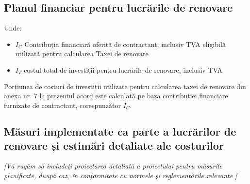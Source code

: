 \subsection{Planul financiar pentru lucrările de renovare}


\begin{center}
\end{center}

\vspace{1cm}

Unde:

\begin{itemize}[label={}]
	\item $I_C$ \quad \quad Contribuția financiară oferită de contractant, inclusiv TVA eligibilă utilizată pentru calcularea Taxei de renovare
	\item $I_T$ \quad \quad costul total de investiții pentru lucrările de renovare, inclusiv TVA
\end{itemize}

\vspace{1cm}

Porțiunea de costuri de investiții utilizate pentru calcularea taxei de renovare din anexa nr. 7 la prezentul acord este calculată pe baza contribuției financiare furnizate de contractant, corespunzător $I_C$.

\subsection{Măsuri implementate ca parte a lucrărilor de renovare și estimări detaliate ale costurilor}

	\textit{[Vă rugăm să includeţi proiectarea detaliată a proiectului pentru măsurile planificate, duupă caz, în conformitate cu normele şi reglementările relevante ]}

